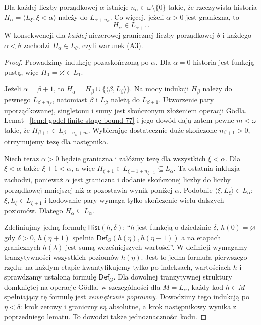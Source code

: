 \begin{lemat}
\label{lem:l-all-stage-histories-78}
Dla każdej liczby porządkowej $\alpha$ istnieje
$n_\alpha\in\omega\setminus\{0\}$ takie, że rzeczywista
historia $H_\alpha=\langle L_\xi:\xi<\alpha\rangle$
należy do $L_{\alpha+n_\alpha}$. Co więcej, jeżeli
$\alpha>0$ jest graniczna, to
\[
 H_\alpha\in L_{\alpha+1}.
\]
W konsekwencji dla \emph{każdej} niezerowej granicznej
liczby porządkowej $\theta$ i każdego $\alpha<\theta$
zachodzi $H_\alpha\in L_\theta$, czyli warunek (A3).
\end{lemat}
\begin{proof}
Prowadzimy indukcję pozaskończoną po $\alpha$.
Dla $\alpha=0$ historia jest funkcją pustą, więc
$H_0=\varnothing\in L_1$.

Jeżeli $\alpha=\beta+1$, to
$H_\alpha=H_\beta\cup\{\langle\beta,L_\beta\rangle\}$.
Na mocy indukcji $H_\beta$ należy do pewnego
$L_{\beta+n_\beta}$, natomiast $\beta$ i $L_\beta$
należą do $L_{\beta+1}$. Utworzenie pary
uporządkowanej, singletonu i sumy jest skończonym
złożeniem operacji Gödla. Lemat~
\ref{lem:l-godel-finite-stage-bound-77}
i jego dowód dają zatem pewne $m<\omega$ takie, że
$H_{\beta+1}\in L_{\beta+n_\beta+m}$.
Wybierając dostatecznie duże skończone
$n_{\beta+1}>0$, otrzymujemy tezę dla następnika.

Niech teraz $\alpha>0$ będzie graniczna i
załóżmy tezę dla wszystkich $\xi<\alpha$.
Dla $\xi<\alpha$ także $\xi+1<\alpha$, a więc
$H_{\xi+1}\in L_{\xi+1+n_{\xi+1}}\subseteq L_\alpha$.
Ta ostatnia inkluzja zachodzi, ponieważ
$\alpha$ jest graniczna i dodanie skończonej liczby
do liczby porządkowej mniejszej niż $\alpha$
pozostawia wynik poniżej $\alpha$.
Podobnie $\langle\xi,L_\xi\rangle\in L_\alpha$:
$\xi,L_\xi\in L_{\xi+1}$ i kodowanie pary wymaga
tylko skończenie wielu dalszych poziomów.
Dlatego $H_\alpha\subseteq L_\alpha$.

Zdefiniujmy jedną formułę $\mathsf{Hist}(h,\delta)$:
``$h$ jest funkcją o dziedzinie $\delta$,
$h(0)=\varnothing$ gdy $\delta>0$,
$h(\eta+1)$ spełnia $\mathsf{Def}_G(h(\eta),h(\eta+1))$
a na etapach granicznych $h(\lambda)$ jest sumą
wcześniejszych wartości''. W definicji wymagamy
tranzytywności wszystkich poziomów $h(\eta)$.
Jest to jedna formuła pierwszego rzędu: na każdym
etapie kwantyfikujemy tylko po indeksach, wartościach
$h$ i sprawdzamy ustaloną formułę $\mathsf{Def}_G$.
Dla dowolnej tranzytywnej struktury domkniętej na
operacje Gödla, w szczególności dla
$M=L_\alpha$, każdy kod $h\in M$ spełniający
tę formułę jest \emph{zewnętrznie poprawny}.
Dowodzimy tego indukcją po $\eta<\delta$:
krok zerowy i graniczny są absolutne, a krok
następnikowy wynika z poprzedniego lematu.
To dowodzi także jednoznaczności kodu.


\end{proof}
